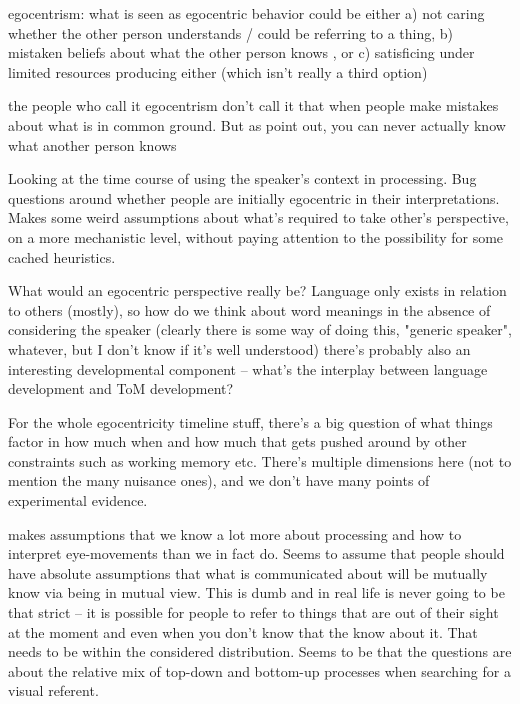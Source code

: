 \documentclass[]{article}
\begin{document}
egocentrism: what is seen as egocentric behavior could be either a) not caring whether the other person understands / could be referring to a thing, b) mistaken beliefs about what the other person knows , or c) satisficing under limited resources producing either (which isn't really a third option) 

the people who call it egocentrism don't call it that when people make mistakes about what is in common ground. But as \cite{hanna2003} point out, you can never actually know what another person knows 

\cite{hanna2003} Looking at the time course of using the speaker's context in processing. Bug questions around whether people are initially egocentric in their interpretations. Makes some weird assumptions about what's required to take other's perspective, on a more mechanistic level, without paying attention to the possibility for some cached heuristics. 

What would an egocentric perspective really be? Language only exists in relation to others (mostly), so how do we think about word meanings in the absence of considering the speaker (clearly there is some way of doing this, "generic speaker", whatever, but I don't know if it's well understood) there's probably also an interesting developmental component -- what's the interplay between language development and ToM development? 





For the whole egocentricity timeline stuff, there's a big question of what things factor in how much when and how much that gets pushed around by other constraints such as working memory etc. There's multiple dimensions here (not to mention the many nuisance ones), and we don't have many points of experimental evidence. 

\cite{keysar2000} makes assumptions that we know a lot more about processing and how to interpret eye-movements than we in fact do. Seems to assume that people should have absolute assumptions that what is communicated about will be mutually know via being in mutual view. This is dumb and in real life is never going to be that strict -- it is possible for people to refer to things that are out of their sight at the moment and even when you don't know that the know about it. That needs to be within the considered distribution. Seems to be that the questions are about the relative mix of top-down and bottom-up processes when searching for a visual referent. 
\end{document}
